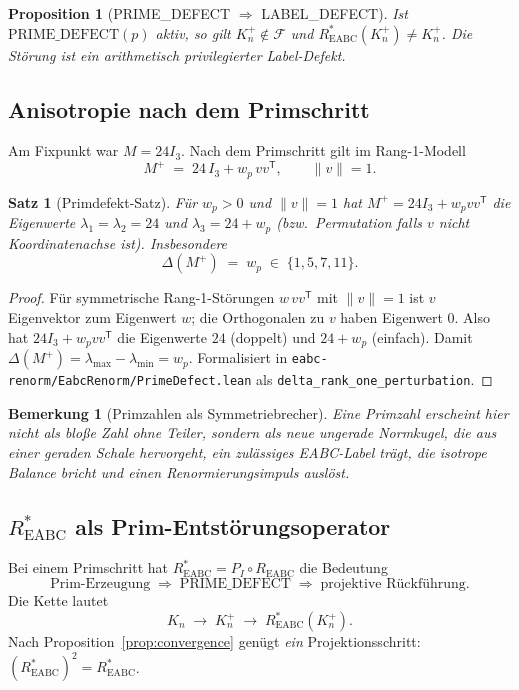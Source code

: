 \documentclass[11pt,a4paper]{article}
\newtheorem{theorem}{Satz}
\newtheorem{remark}{Bemerkung}
\newtheorem{proposition}{Proposition}
\begin{document}
\begin{proposition}[PRIME\_DEFECT $\Rightarrow$ LABEL\_DEFECT]
\label{prop:prime-implies-label}
Ist $\text{PRIME\_DEFECT}(p)$ aktiv, so gilt $K_n^+\notin\mathcal{F}$ und
$R^*_{\mathrm{EABC}}(K_n^+)\neq K_n^+$.
Die Störung ist ein \emph{arithmetisch privilegierter} Label-Defekt.
\end{proposition}

\subsection{Anisotropie nach dem Primschritt}

Am Fixpunkt war $M=24I_3$.
Nach dem Primschritt gilt im Rang-1-Modell
\[
  M^+ \;=\; 24\,I_3 + w_p\, v v^{\mathsf T},
  \qquad \|v\|=1.
\]

\begin{theorem}[Primdefekt-Satz]
\label{thm:prime-delta}
Für $w_p>0$ und $\|v\|=1$ hat $M^+=24I_3+w_p vv^{\mathsf T}$ die Eigenwerte
$\lambda_1=\lambda_2=24$ und $\lambda_3=24+w_p$ (bzw.\ Permutation falls $v$ nicht
Koordinatenachse ist).
Insbesondere
\[
  \Delta(M^+) \;=\; w_p \;\in\; \{1,5,7,11\}.
\]
\end{theorem}

\begin{proof}
Für symmetrische Rang-1-Störungen $w\,vv^{\mathsf T}$ mit $\|v\|=1$ ist $v$ Eigenvektor
zum Eigenwert $w$; die Orthogonalen zu $v$ haben Eigenwert $0$.
Also hat $24I_3+w_p vv^{\mathsf T}$ die Eigenwerte $24$ (doppelt) und $24+w_p$ (einfach).
Damit $\Delta(M^+)=\lambda_{\max}-\lambda_{\min}=w_p$.
Formalisiert in \texttt{eabc-renorm/EabcRenorm/PrimeDefect.lean}
als \texttt{delta\_rank\_one\_perturbation}.
\end{proof}

\begin{remark}[Primzahlen als Symmetriebrecher]
Eine Primzahl erscheint hier nicht als bloße Zahl ohne Teiler, sondern als
\emph{neue ungerade Normkugel}, die aus einer geraden Schale hervorgeht,
ein zulässiges EABC-Label trägt, die isotrope Balance bricht und einen
Renormierungsimpuls auslöst.
\end{remark}

\subsection{$R^*_{\mathrm{EABC}}$ als Prim-Entstörungsoperator}

Bei einem Primschritt hat $R^*_{\mathrm{EABC}}=P_I\circ R_{\mathrm{EABC}}$ die Bedeutung
\[
  \text{Prim-Erzeugung}
  \;\Rightarrow\;
  \text{PRIME\_DEFECT}
  \;\Rightarrow\;
  \text{projektive Rückführung}.
\]
Die Kette lautet
\[
  K_n \;\longrightarrow\; K_n^+ \;\longrightarrow\; R^*_{\mathrm{EABC}}(K_n^+).
\]
Nach Proposition~\ref{prop:convergence} genügt \emph{ein} Projektionsschritt:
$(R^*_{\mathrm{EABC}})^2=R^*_{\mathrm{EABC}}$.
\end{document}
